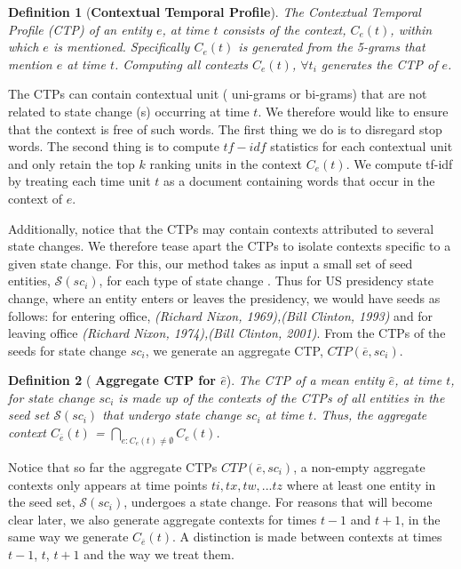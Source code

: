\documentclass[11pt,a4paper]{article}
\newtheorem{definition}{Definition}
\newcommand{\ignore}[1]{}
\begin{document}
\begin{definition}[\textbf{Contextual Temporal Profile}]
The Contextual Temporal Profile (CTP) of an entity $e$, at time $t$ consists of
the context, $C_e(t)$, within which $e$ is mentioned. Specifically $C_e(t)$  is generated from the  5-grams that mention $e$ at time $t$.\ignore{Ndapa:uni or bigrams??}  Computing all contexts $C_e(t)$, $\forall t_i$ generates the CTP of $e$.
\end{definition}

The CTPs can contain contextual unit ( uni-grams or bi-grams) that are not related to state change (s) occurring at time $t$. We therefore would like to ensure that the context is free of such words. The first thing we do is to disregard stop words. The second thing is to compute $tf-idf$ statistics for each contextual unit  and only retain the top $k$ ranking units in the context $C_e(t)$. We compute tf-idf by  treating each time unit $t$ as a document containing words that occur in the context of $e$.

Additionally, notice that the  CTPs may contain contexts attributed  to several state changes. We therefore tease apart the CTPs to isolate contexts specific to a given state change. For this, our method takes as input  a small set of seed entities, $\mathcal{S}(sc_i)$, for each type of state change . Thus for  US presidency state change, where an entity enters or leaves the presidency, we would have seeds as follows: for entering office,  \textit{(Richard Nixon, 1969),(Bill Clinton, 1993)} and for leaving office \textit{(Richard Nixon, 1974),(Bill Clinton, 2001)}. From the CTPs of the seeds for state change $sc_i$, we generate an aggregate  CTP, $CTP(\overline{e}, sc_i)$.

\begin{definition}[\textbf{ Aggregate CTP for $\hat{e}$}]
The CTP of a mean entity $\hat{e}$, at time $t$, for state change $sc_i$ is made up of the contexts of the CTPs of all entities in the seed set  $\mathcal{S}(sc_i)$ that undergo state change $sc_i$ at time $t$.
Thus,  the aggregate context $C_{\overline{e}}(t)$ = $\bigcap_{ e : C_e(t) \neq \emptyset } C_{e}(t) $. 

\end{definition}

Notice that so  far  the aggregate CTPs $CTP(\overline{e}, sc_i)$, a non-empty aggregate   contexts  only appears at time points $ti, tx, tw, ... tz$ where at least one  entity in the seed set, $\mathcal{S}(sc_i)$, undergoes a state change. For reasons that will become clear later,  we also generate aggregate contexts for times $t-1$ and $t+1$, in the same way we generate $C_{\overline{e}}(t)$. A distinction  is made between contexts at times $t-1$, $t$, $t+1$ and the way we treat them. 
\end{document}
